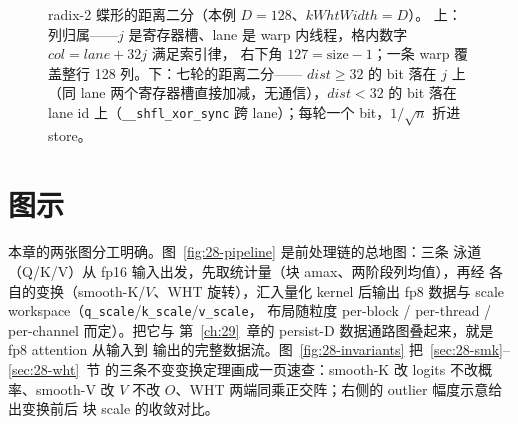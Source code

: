 \begin{figure}[H]
\caption{radix-2 蝶形的距离二分（本例 $D{=}128$、$kWhtWidth{=}D$）。
上：列归属——$j$ 是寄存器槽、lane 是 warp 内线程，格内数字 $col=lane+32j$ 满足索引律，
右下角 $127=\mathrm{size}-1$；一条 warp 覆盖整行 128 列。下：七轮的距离二分——
$dist\ge32$ 的 bit 落在 $j$ 上（同 lane 两个寄存器槽直接加减，无通信），$dist<32$ 的 bit
落在 lane id 上（\texttt{\_\_shfl\_xor\_sync} 跨 lane）；每轮一个 bit，$1/\sqrt n$ 折进
store。}
\label{fig:28-wht-butterfly}
\end{figure}

\section{图示}

本章的两张图分工明确。图~\ref{fig:28-pipeline} 是前处理链的总地图：三条
泳道（Q/K/V）从 fp16 输入出发，先取统计量（块 amax、两阶段列均值），再经
各自的变换（smooth-K/$V$、WHT 旋转），汇入量化 kernel 后输出 fp8 数据与
scale workspace（\texttt{q\_scale}/\texttt{k\_scale}/\texttt{v\_scale}，
布局随粒度 per-block / per-thread / per-channel 而定）。把它与
第~\ref{ch:29}~章的 persist-D 数据通路图叠起来，就是 fp8 attention 从输入到
输出的完整数据流。图~\ref{fig:28-invariants} 把~\ref{sec:28-smk}--\ref{sec:28-wht}~节
的三条不变变换定理画成一页速查：smooth-K 改 logits 不改概率、smooth-V 改
$V$ 不改 $O$、WHT 两端同乘正交阵；右侧的 outlier 幅度示意给出变换前后
块 scale 的收敛对比。

